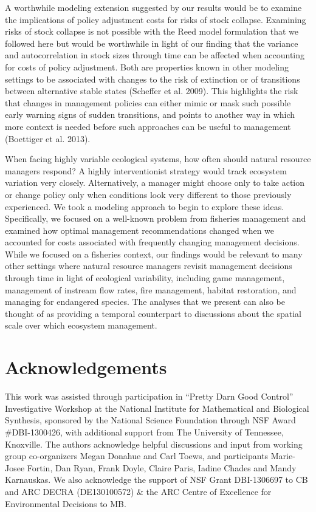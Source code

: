 \documentclass[review,12pt,author-year,titlepage]{components/elsarticle} %
\begin{document}
\begin{flushleft}
A worthwhile modeling extension suggested by our results would be to
examine the implications of policy adjustment costs for risks of stock
collapse. Examining risks of stock collapse is not possible with the
Reed model formulation that we followed here but would be worthwhile in
light of our finding that the variance and autocorrelation in stock
sizes through time can be affected when accounting for costs of policy
adjustment. Both are properties known in other modeling settings to be
associated with changes to the risk of extinction or of transitions
between alternative stable states (Scheffer et al. 2009). This
highlights the risk that changes in management policies can either mimic
or mask such possible early warning signs of sudden transitions, and
points to another way in which more context is needed before such
approaches can be useful to management (Boettiger et al. 2013).

When facing highly variable ecological systems, how often should natural
resource managers respond? A highly interventionist strategy would track
ecosystem variation very closely. Alternatively, a manager might choose
only to take action or change policy only when conditions look very
different to those previously experienced. We took a modeling approach
to begin to explore these ideas. Specifically, we focused on a
well-known problem from fisheries management and examined how optimal
management recommendations changed when we accounted for costs
associated with frequently changing management decisions. While we
focused on a fisheries context, our findings would be relevant to many
other settings where natural resource managers revisit management
decisions through time in light of ecological variability, including
game management, management of instream flow rates, fire management,
habitat restoration, and managing for endangered species. The analyses
that we present can also be thought of as providing a temporal
counterpart to discussions about the spatial scale over which ecosystem
management.

\section{Acknowledgements}\label{acknowledgements}

This work was assisted through participation in ``Pretty Darn Good
Control'' Investigative Workshop at the National Institute for
Mathematical and Biological Synthesis, sponsored by the National Science
Foundation through NSF Award \#DBI-1300426, with additional support from
The University of Tennessee, Knoxville. The authors acknowledge helpful
discussions and input from working group co-organizers Megan Donahue and
Carl Toews, and participants Marie-Josee Fortin, Dan Ryan, Frank Doyle,
Claire Paris, Iadine Chades and Mandy Karnauskas. We also acknowledge
the support of NSF Grant DBI-1306697 to CB and ARC DECRA (DE130100572)
\& the ARC Centre of Excellence for Environmental Decisions to MB.


\end{flushleft}
\end{document}
